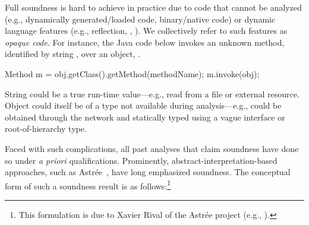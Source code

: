 Full soundness is hard to achieve in practice due to code that cannot
be analyzed (e.g., dynamically generated/loaded code, binary/native
code) or dynamic language features (e.g., reflection, ,
). We collectively refer to such features as
\emph{opaque code}. For instance, the Java code below invokes an
unknown method, identified by string , over an
object, .

\vspace{-3mm}\begin{minipage}[l]{5.1in}
\begin{javacodeNoLines}
Method m = obj.getClass().getMethod(methodName);
m.invoke(obj);  
\end{javacodeNoLines}
\end{minipage}

\noindent String  could be a true run-time value---e.g., read
from a file or external resource. Object  could itself be of a
type not available during analysis---e.g.,  could be obtained
through the network and statically typed using a vague interface or
root-of-hierarchy type.



Faced with such complications, all past analyses that claim soundness
have done so under \emph{a priori} qualifications. Prominently,
abstract-interpretation-based~\cite{popl:1977:Cousot}
approaches, such as Astr\'{e}e~\cite{sas:2007:Delmas}, have long emphasized
soundness. The conceptual form of such a soundness result is as
follows:\footnote{This formulation is due to Xavier Rival of the Astr\'{e}e project
  (e.g., \cite{misc:Xavier}).}

